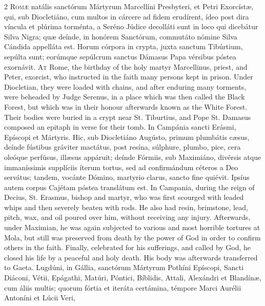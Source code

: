 \begin{paracol}{2}
\lettrine[lines=2]{R}{omæ} natális sanctórum 
 Mártyrum Marcellíni Presbyteri, et Petri Exorcístæ, qui, sub Diocletiáno, 
 cum multos in cárcere ad fidem erudírent, ídeo post dira víncula et plúrima 
 torménta, a Seréno Júdice decolláti sunt in loco qui dicebátur Silva Nigra; 
 quæ deínde, in honórem Sanctórum, commutáto nómine Silva Cándida appelláta 
 est. Horum córpora in crypta, juxta sanctum Tibúrtium, sepúlta sunt; 
 eorúmque sepúlcrum sanctus Dámasus Papa vérsibus póstea exornávit.
\switchcolumn
{}
\lettrine[lines=2]{A}{t} Rome, the birthday of the holy 
 martyr Marcellinus, priest, and Peter, exorcist, who instructed in the faith 
 many persons kept in prison. Under Diocletian, they were loaded with 
 chains, and after enduring many torments, were beheaded by Judge Serenus, in 
 a place which was then called the Black Forest, but which was in their 
 honour afterwards known as the White Forest. Their bodies were buried 
 in a crypt near St. Tiburtius, and Pope St. Damasus composed an epitaph in 
 verse for their tomb.
\switchcolumn*
{}
In Campánia sancti 
 Erásmi, Epíscopi et Mártyris. Hic, sub Diocletiáno Augústo, primum 
 plumbátis cæsus, deínde fústibus gráviter mactátus, post resína, súlphure, 
 plumbo, pice, cera oleóque perfúsus, illæsus appáruit; deínde Fórmiis, sub 
 Maximiáno, divérsis atque immaníssimis supplíciis íterum tortus, sed ad 
 confirmándum céteros a Deo servátus; tandem, vocánte Dómino, martyrio clarus, 
 sancto fine quiévit. Ipsíus autem corpus Cajétam póstea translátum 
 est.
\switchcolumn
{}
In Campania, during the reign of 
 Decius, St. Erasmus, bishop and martyr, who was first scourged with leaded 
 whips and then severely beaten with rods. He also had resin, 
 brimstone, lead, pitch, wax, and oil poured over him, without receiving any 
 injury. Afterwards, under Maximian, he was again subjected to various 
 and most horrible tortures at Mola, but still was preserved from death by 
 the power of God in order to confirm others in the faith. Finally, 
 celebrated for his sufferings, and called by God, he closed his life by a 
 peaceful and holy death. His body was afterwards transferred to Gaeta.
\switchcolumn*
{}
Lugdúni, in Gállia, 
 sanctórum Mártyrum Pothíni Epíscopi, Sancti Diáconi, Vétii, Epágathi, Matúri, 
 Póntici, Bíblidis, Attali, Alexándri et Blandínæ, cum áliis multis; quorum 
 fórtia et iteráta certámina, témpore Marci Aurélii Antoníni et Lúcii Veri, 

\end{paracol}
